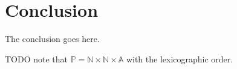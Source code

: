 \documentclass[journal]{IEEEtran}
\begin{document}
%






\section{Conclusion}
The conclusion goes here.

TODO note that $\mathbb P = \mathbb N \times \mathbb N \times \mathbb A$
with the lexicographic order.




\end{document}
